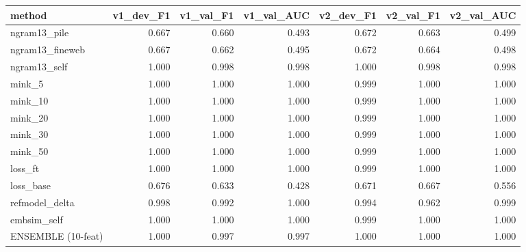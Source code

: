 \begin{tabular}{lrrrrrr}
\toprule
method & v1_dev_F1 & v1_val_F1 & v1_val_AUC & v2_dev_F1 & v2_val_F1 & v2_val_AUC \\
\midrule
ngram13_pile & 0.667 & 0.660 & 0.493 & 0.672 & 0.663 & 0.499 \\
ngram13_fineweb & 0.667 & 0.662 & 0.495 & 0.672 & 0.664 & 0.498 \\
ngram13_self & 1.000 & 0.998 & 0.998 & 1.000 & 0.998 & 0.998 \\
mink_5 & 1.000 & 1.000 & 1.000 & 0.999 & 1.000 & 1.000 \\
mink_10 & 1.000 & 1.000 & 1.000 & 0.999 & 1.000 & 1.000 \\
mink_20 & 1.000 & 1.000 & 1.000 & 0.999 & 1.000 & 1.000 \\
mink_30 & 1.000 & 1.000 & 1.000 & 0.999 & 1.000 & 1.000 \\
mink_50 & 1.000 & 1.000 & 1.000 & 0.999 & 1.000 & 1.000 \\
loss_ft & 1.000 & 1.000 & 1.000 & 0.999 & 1.000 & 1.000 \\
loss_base & 0.676 & 0.633 & 0.428 & 0.671 & 0.667 & 0.556 \\
refmodel_delta & 0.998 & 0.992 & 1.000 & 0.994 & 0.962 & 0.999 \\
embsim_self & 1.000 & 1.000 & 1.000 & 0.999 & 1.000 & 1.000 \\
ENSEMBLE (10-feat) & 1.000 & 0.997 & 0.997 & 1.000 & 1.000 & 1.000 \\
\bottomrule
\end{tabular}
